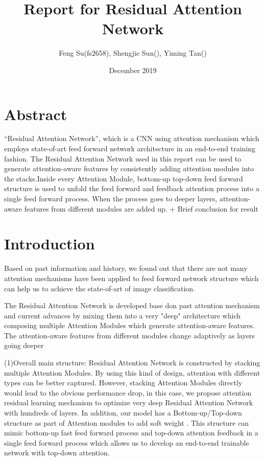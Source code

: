 \documentclass{article}
\title{Report for Residual Attention Network}
\author{Feng Su(fs2658), Shengjie Sun(), Yiming Tan() }
\date{December 2019}
\begin{document}
\maketitle
\begin{multicols}{2}


\section{Abstract}
  “Residual Attention Network”, which is
a CNN using attention mechanism which employs state-of-art feed forward network architecture in an end-to-end training fashion.
The Residual Attention Network used in this report can be used to generate attention-aware features by consistently adding attention modules into the stacks.Inside every Attention
Module, bottom-up top-down feed forward structure is used
to unfold the feed forward and feedback attention process
into a single feed forward process. When the process goes to deeper layers, attention-aware features from different modules are added up.
+ Brief conclusion for result

\section{Introduction}

Based on past information and history, we found out that there are not many attention mechanisms have been applied to feed forward network structure which can help us to achieve the state-of-art of image classification.

The Residual Attention Network is developed base don past attention mechanism and current advances by mixing them into a very "deep" architecture which composing multiple Attention Modules which generate attention-aware features. The attention-aware features from different modules change adaptively as layers going deeper


(1)Overall main structure:
Residual Attention Network is constructed by stacking multiple Attention Modules. By using this kind of design, attention with different types can be better captured. However, stacking Attention Modules directly would lead to the obvious performance drop, in this case, we propose attention residual learning mechanism to optimize very deep Residual Attention Network with hundreds of layers. In addition, our model has a Bottom-up/Top-down structure as part of Attention modules to add soft weight . This structure can mimic bottom-up fast feed forward process and top-down attention feedback in a single feed forward process which allows us to develop an end-to-end trainable network with top-down attention. 


\end{multicols}
\end{document}
